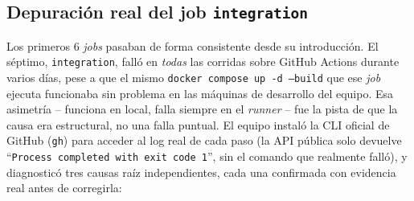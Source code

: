 \subsection{Depuración real del job \texttt{integration}}
\label{sec:cicd-depuracion}

Los primeros 6 \emph{jobs} pasaban de forma consistente desde su introducción. El séptimo,
\texttt{integration}, falló en \emph{todas} las corridas sobre GitHub Actions durante varios
días, pese a que el mismo \texttt{docker compose up -d --build} que ese \emph{job} ejecuta
funcionaba sin problema en las máquinas de desarrollo del equipo. Esa asimetría -- funciona en
local, falla siempre en el \emph{runner} -- fue la pista de que la causa era estructural, no una
falla puntual. El equipo instaló la CLI oficial de GitHub (\texttt{gh}) para acceder al log real
de cada paso (la API pública solo devuelve \enquote{\texttt{Process completed with exit code 1}},
sin el comando que realmente falló), y diagnosticó tres causas raíz independientes, cada una
confirmada con evidencia real antes de corregirla:

